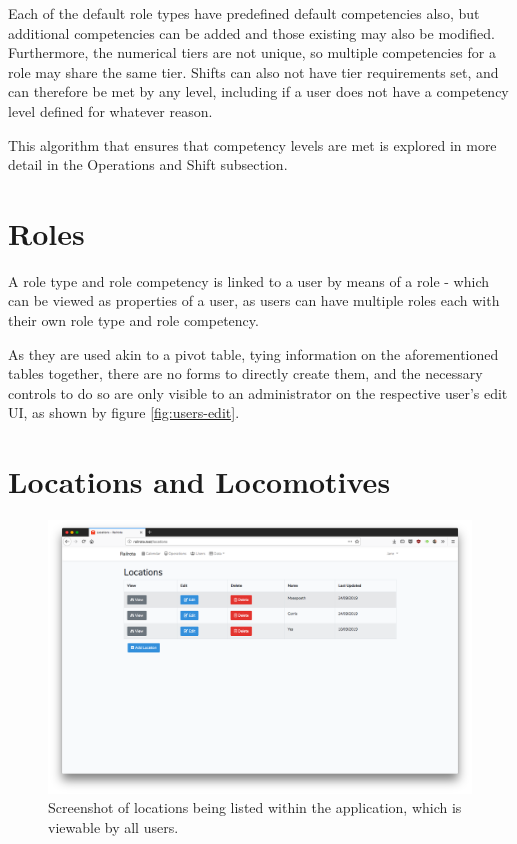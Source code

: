 Each of the default role types have predefined default competencies also, but additional competencies can be added and those existing may also be modified. Furthermore, the numerical tiers are not unique, so multiple competencies for a role may share the same tier. Shifts can also not have tier requirements set, and can therefore be met by any level, including if a user does not have a competency level defined for whatever reason.

This algorithm that ensures that competency levels are met is explored in more detail in the Operations and Shift subsection.

\section{Roles}

A role type and role competency is linked to a user by means of a role - which can be viewed as properties of a user, as users can have multiple roles each with their own role type and role competency.

As they are used akin to a pivot table, tying information on the aforementioned tables together, there are no forms to directly create them, and the necessary controls to do so are only visible to an administrator on the respective user's edit UI, as shown by figure \ref{fig:users-edit}.

\section{Locations and Locomotives}

\begin{figure}[!ht]
    \centering
    \includegraphics[width=1.0\textwidth]{Figures/screenshot-locations}
    \caption{Screenshot of locations being listed within the application, which is viewable by all users.}
    \label{fig:locations}
\end{figure}


